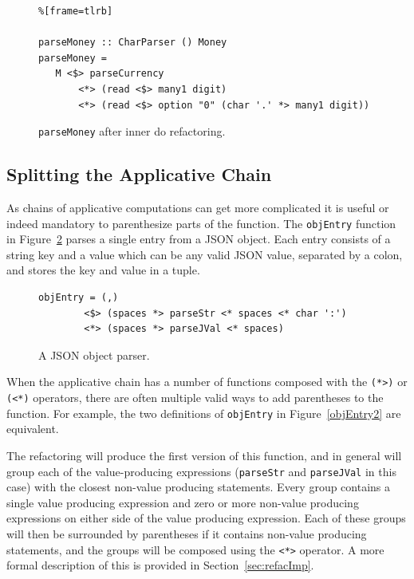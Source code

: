 \begin{figure}[t]
 \begin{lstlisting}%[frame=tlrb]

parseMoney :: CharParser () Money
parseMoney = 
   M <$> parseCurrency 
	   <*> (read <$> many1 digit) 
	   <*> (read <$> option "0" (char '.' *> many1 digit))
\end{lstlisting}
\caption{\texttt{parseMoney} after inner do refactoring.}
\label{parseMon_ref2}
\end{figure}

\subsection{Splitting the Applicative Chain}
As chains of applicative computations can get more complicated it is useful or indeed mandatory to parenthesize parts of the function. The \texttt{objEntry} function in Figure~\ref{objEntry} parses a single entry from a JSON object. Each entry consists of a string key and a value which can be any valid JSON value, separated by a colon, and stores the key and value in a tuple. 

\begin{figure}[t]
\begin{lstlisting}
objEntry = (,) 
        <$> (spaces *> parseStr <* spaces <* char ':') 
        <*> (spaces *> parseJVal <* spaces)
\end{lstlisting}
\caption{A JSON object parser.}
\label{objEntry}
\end{figure}

When the applicative chain has a number of functions composed with the \texttt{(*>)} or \texttt{(<*)} operators, there are often multiple valid ways to add parentheses to the function. For example, the two definitions of \texttt{objEntry} in Figure~\ref{objEntry2} are equivalent.

The refactoring will produce the first version of this function, and in general will group each of the value-producing expressions (\texttt{parseStr} and \texttt{parseJVal} in this case) with the closest non-value producing statements. Every group contains a single value producing expression and zero or more non-value producing expressions on either side of the value producing expression. Each of these groups will then be surrounded by parentheses if it contains non-value producing statements, and the groups will be composed using the \texttt{<*>} operator. A more formal description of this is provided in Section~\ref{sec:refacImp}.


